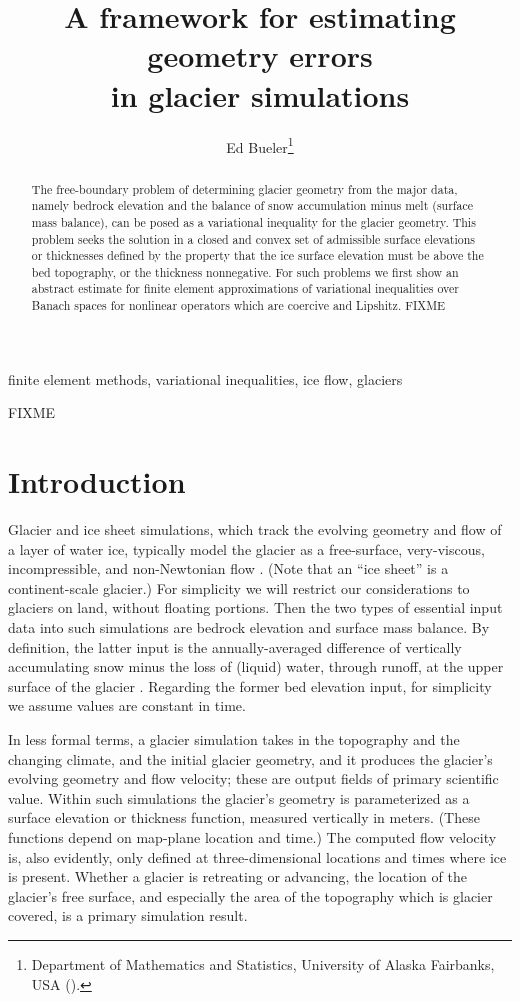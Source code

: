 \documentclass[hidelinks,onefignum,onetabnum,final]{siamart220329}  %
\title{A framework for estimating geometry errors \\ in glacier simulations}
\author{Ed Bueler\thanks{Department of Mathematics and Statistics, University of Alaska Fairbanks, USA (\email{elbueler@alaska.edu}).}}
\begin{document}
\maketitle

\begin{abstract}
The free-boundary problem of determining glacier geometry from the major data, namely bedrock elevation and the balance of snow accumulation minus melt (surface mass balance), can be posed as a variational inequality for the glacier geometry.  This problem seeks the solution in a closed and convex set of admissible surface elevations or thicknesses defined by the property that the ice surface elevation must be above the bed topography, or the thickness nonnegative.  For such problems we first show an abstract estimate for finite element approximations of variational inequalities over Banach spaces for nonlinear operators which are coercive and Lipshitz.  FIXME
\end{abstract}

\begin{keywords}
finite element methods, variational inequalities, ice flow, glaciers
\end{keywords}

\begin{MSCcodes}
FIXME
\end{MSCcodes}


\section{Introduction} \label{sec:intro}

Glacier and ice sheet simulations, which track the evolving geometry and flow of a layer of water ice, typically model the glacier as a free-surface, very-viscous, incompressible, and non-Newtonian flow \cite{SchoofHewitt2013}.  (Note that an ``ice sheet'' is a continent-scale glacier.)  For simplicity we will restrict our considerations to glaciers on land, without floating portions.  Then the two types of essential input data into such simulations are bedrock elevation and surface mass balance.  By definition, the latter input is the annually-averaged difference of vertically accumulating snow minus the loss of (liquid) water, through runoff, at the upper surface of the glacier \cite{Cogleyetal2011}.  Regarding the former bed elevation input, for simplicity we assume values are constant in time.

In less formal terms, a glacier simulation takes in the topography and the changing climate, and the initial glacier geometry, and it produces the glacier's evolving geometry and flow velocity; these are output fields of primary scientific value.  Within such simulations the glacier's geometry is parameterized as a surface elevation or thickness function, measured vertically in meters.  (These functions depend on map-plane location and time.)  The computed flow velocity is, also evidently, only defined at three-dimensional locations and times where ice is present.  Whether a glacier is retreating or advancing, the location of the glacier's free surface, and especially the area of the topography which is glacier covered, is a primary simulation result.
\end{document}
